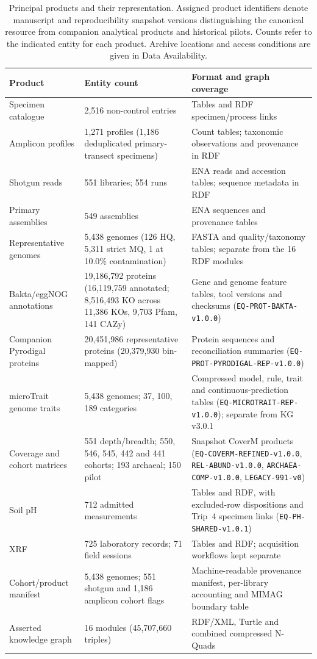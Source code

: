 \begin{revision}
\begin{table}[h]\centering\small
\caption{Principal products and their representation. Assigned product identifiers denote manuscript and reproducibility snapshot versions distinguishing the canonical resource from companion analytical products and historical pilots. Counts refer to the indicated entity for each product. Archive locations and access conditions are given
in Data Availability.}\label{tab:products}
\begin{tabular}{p{}p{}p{}}\toprule
Product & Entity count & Format and graph coverage \tabularnewline\midrule
Specimen catalogue & 2,516 non-control entries & Tables and RDF specimen/process links \tabularnewline
Amplicon profiles & 1,271 profiles (1,186 deduplicated primary-transect specimens) & Count tables; taxonomic observations and provenance in RDF \tabularnewline
Shotgun reads & 551 libraries; 554 runs & ENA reads and accession tables; sequence metadata in RDF \tabularnewline
Primary assemblies & 549 assemblies & ENA sequences and provenance tables \tabularnewline
Representative genomes & 5,438 genomes (126 HQ, 5,311 strict MQ, 1 at 10.0\% contamination) & FASTA and quality/taxonomy tables; separate from the 16 RDF modules \tabularnewline
Bakta/eggNOG annotations & 19,186,792 proteins (16,119,759 annotated; 8,516,493 KO across 11,386 KOs, 9,703 Pfam, 141 CAZy) & Gene and genome feature tables, tool versions and checksums (\texttt{EQ-PROT-BAKTA-v1.0.0}) \tabularnewline
Companion Pyrodigal proteins & 20,451,986 representative proteins (20,379,930 bin-mapped) & Protein sequences and reconciliation summaries (\texttt{EQ-PROT-PYRODIGAL-REP-v1.0.0}) \tabularnewline
microTrait genome traits & 5,438 genomes; 37, 100, 189 categories & Compressed model, rule, trait and continuous-prediction tables (\texttt{EQ-MICROTRAIT-\allowbreak REP-\allowbreak v1.0.0}); separate from KG v3.0.1 \tabularnewline
Coverage and cohort matrices & 551 depth/breadth; 550, 546, 545, 442 and 441 cohorts; 193 archaeal; 150 pilot & Snapshot CoverM products (\texttt{EQ-COVERM-REFINED-v1.0.0}, \texttt{REL-ABUND-v1.0.0}, \texttt{ARCHAEA-COMP-v1.0.0}, \texttt{LEGACY-991-v0}) \tabularnewline
Soil pH & 712 admitted measurements & Tables and RDF, with excluded-row dispositions and Trip~4 specimen links (\texttt{EQ-PH-SHARED-v1.0.1}) \tabularnewline
XRF & 725 laboratory records; 71 field sessions & Tables and RDF; acquisition workflows kept separate \tabularnewline
Cohort/product manifest & 5,438 genomes; 551 shotgun and 1,186 amplicon cohort flags & Machine-readable provenance manifest, per-library accounting and MIMAG boundary table \tabularnewline
Asserted knowledge graph & 16 modules (45,707,660 triples) & RDF/XML, Turtle and combined compressed N-Quads \tabularnewline
\bottomrule\end{tabular}\end{table}


\end{revision}
